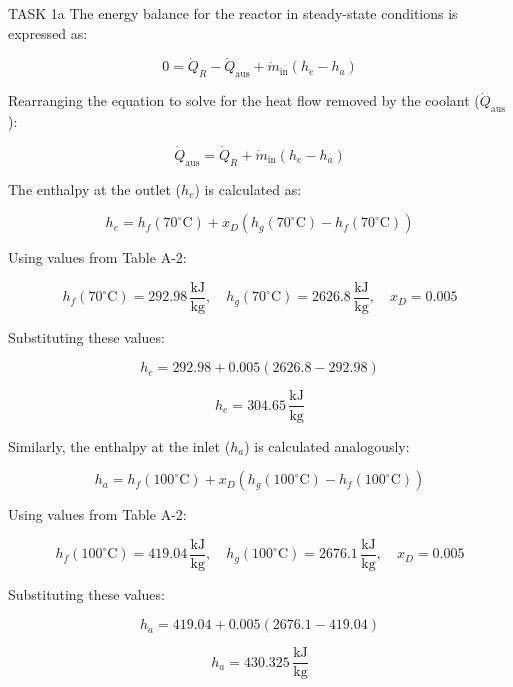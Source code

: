 TASK 1a  
The energy balance for the reactor in steady-state conditions is expressed as:  

\[
0 = \dot{Q}_R - \dot{Q}_{\text{aus}} + \dot{m}_{\text{in}} \left( h_e - h_a \right)
\]

Rearranging the equation to solve for the heat flow removed by the coolant (\( \dot{Q}_{\text{aus}} \)):  

\[
\dot{Q}_{\text{aus}} = \dot{Q}_R + \dot{m}_{\text{in}} \left( h_e - h_a \right)
\]

The enthalpy at the outlet (\( h_e \)) is calculated as:  

\[
h_e = h_f(70^\circ\text{C}) + x_D \left( h_g(70^\circ\text{C}) - h_f(70^\circ\text{C}) \right)
\]

Using values from Table A-2:  

\[
h_f(70^\circ\text{C}) = 292.98 \, \frac{\text{kJ}}{\text{kg}}, \quad h_g(70^\circ\text{C}) = 2626.8 \, \frac{\text{kJ}}{\text{kg}}, \quad x_D = 0.005
\]

Substituting these values:  

\[
h_e = 292.98 + 0.005 \left( 2626.8 - 292.98 \right)
\]

\[
h_e = 304.65 \, \frac{\text{kJ}}{\text{kg}}
\]

Similarly, the enthalpy at the inlet (\( h_a \)) is calculated analogously:  

\[
h_a = h_f(100^\circ\text{C}) + x_D \left( h_g(100^\circ\text{C}) - h_f(100^\circ\text{C}) \right)
\]

Using values from Table A-2:  

\[
h_f(100^\circ\text{C}) = 419.04 \, \frac{\text{kJ}}{\text{kg}}, \quad h_g(100^\circ\text{C}) = 2676.1 \, \frac{\text{kJ}}{\text{kg}}, \quad x_D = 0.005
\]

Substituting these values:  

\[
h_a = 419.04 + 0.005 \left( 2676.1 - 419.04 \right)
\]

\[
h_a = 430.325 \, \frac{\text{kJ}}{\text{kg}}
\]